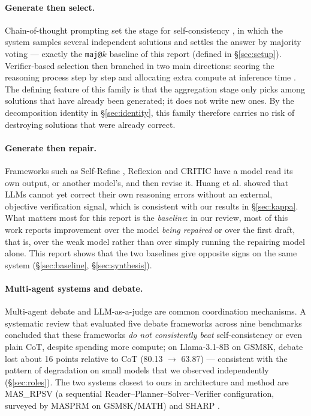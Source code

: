 \documentclass[11pt,a4paper]{article}
\begin{document}
\paragraph{Generate then select.} Chain-of-thought prompting \cite{wei2022} set the stage for self-consistency
\cite{wang2023}, in which the system samples several independent solutions and settles the answer by majority
voting --- exactly the \texttt{maj@}$k$ baseline of this report (defined in \S\ref{sec:setup}). Verifier-based selection then branched in two main directions: scoring the reasoning process step by step \cite{lightman2024} and allocating extra compute at inference time \cite{snell2024}. The defining feature of this family is that the aggregation stage only picks among solutions that have already been generated; it does not write new
ones. By the decomposition identity in \S\ref{sec:identity}, this family therefore carries no risk of destroying solutions that were already correct.

\paragraph{Generate then repair.} Frameworks such as Self-Refine \cite{madaan2023}, Reflexion \cite{shinn2023} and CRITIC
\cite{gou2024} have a model read its own output, or another model's, and then revise it. Huang et al.
\cite{huang2024} showed that LLMs cannot yet correct their own reasoning errors without an external, objective verification signal, which is consistent with
our results in \S\ref{sec:kappa}. What matters most for this report is the \emph{baseline}: in our review, most of this work reports improvement over the model
\emph{being repaired} or over the first draft, that is, over the weak model rather than over simply running the
repairing model alone. This report shows that the two baselines give opposite signs on the same system (\S\ref{sec:baseline},
\S\ref{sec:synthesis}).

\paragraph{Multi-agent systems and debate.} Multi-agent debate \cite{du2024} and LLM-as-a-judge
\cite{zheng2023} are common coordination mechanisms. A systematic review \cite{mad2025baseline}
that evaluated five debate frameworks across nine benchmarks concluded that these frameworks \emph{do not
consistently beat} self-consistency or even plain CoT, despite spending more compute; on Llama-3.1-8B on
GSM8K, debate lost about 16 points relative to CoT (80.13 $\to$ 63.87) --- consistent with the pattern of
degradation on small models that we observed independently (\S\ref{sec:roles}). The two systems closest to ours in
architecture and method are MAS\_RPSV (a sequential Reader--Planner--Solver--Verifier configuration,
surveyed by MASPRM \cite{masprm2025} on GSM8K/MATH) and SHARP \cite{sharp2025}.
\end{document}
